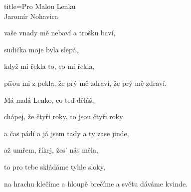 \begin{song}{title=\centering Pro Malou Lenku \\\normalsize Jaromír Nohavica  \vspace*{-0.3cm}}
{vaše vnady mě nebaví a trošku baví,

sudička moje byla slepá,

když mi řekla to, co mi řekla,

píšou mi z pekla, že prý mě zdraví, že prý mě zdraví.




\sloka
Má malá Lenko, co teď děláš,

chápej, že čtyři roky, to jsou čtyři roky

a čas pádí a já jsem tady a ty zase jinde,

až umřem, říkej, žes' nás měla,

to pro tebe skládáme tyhle sloky,

na hrachu klečíme a hloupě brečíme a světu dáváme kvinde.
   



}
\setcounter{Slokočet}{0}
\end{song}
